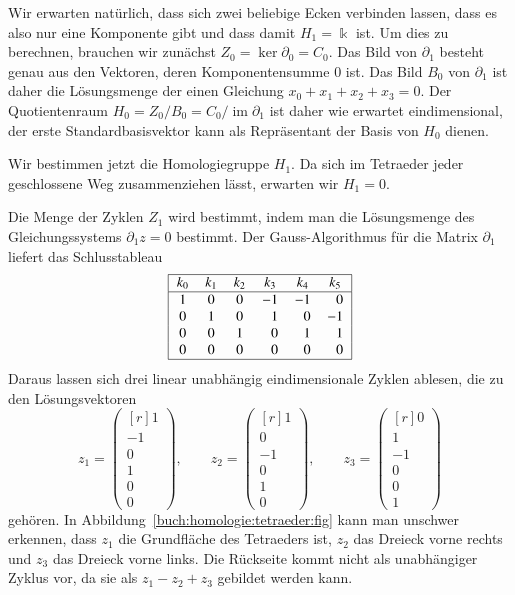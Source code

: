 \begin{beispiel}
Wir erwarten natürlich, dass sich zwei beliebige Ecken verbinden lassen,
dass es also nur eine Komponente gibt und dass damit $H_1=\Bbbk$ ist.
Um dies zu berechnen, brauchen wir zunächst $Z_0=\ker\partial_0=C_0$.
Das Bild von $\partial_1$ besteht genau aus den Vektoren,
deren Komponentensumme $0$ ist.
Das Bild $B_0$ von $\partial_1$ ist daher die Lösungsmenge der einen
Gleichung
\(
x_0+x_1+x_2+x_3=0.
\)
Der Quotientenraum $H_0=Z_0/B_0 = C_0/\operatorname{im}\partial_1$
ist daher wie erwartet eindimensional, der erste Standardbasisvektor
kann als Repräsentant der Basis von $H_0$ dienen.

Wir bestimmen jetzt die Homologiegruppe $H_1$.
Da sich im Tetraeder jeder geschlossene Weg zusammenziehen lässt,
erwarten wir $H_1=0$.

Die Menge der Zyklen $Z_1$ wird bestimmt, indem man die Lösungsmenge
des Gleichungssystems $\partial_1z=0$ bestimmt.
Der Gauss-Algorithmus für die Matrix $\partial_1$ liefert das
Schlusstableau
\[
\begin{tabular}{|>{$}c<{$}>{$}c<{$}>{$}c<{$}>{$}c<{$}>{$}c<{$}>{$}c<{$}|}
\hline
k_0&k_1&k_2&k_3&k_4&k_5\\
\hline
   1&  0&  0& -1& -1& \phantom{-}0\\
   0&  1&  0&  \phantom{-}1&  \phantom{-}0& -1\\
   0&  0&  1&  \phantom{-}0&  \phantom{-}1&  \phantom{-}1\\
   0&  0&  0&  \phantom{-}0&  \phantom{-}0&  \phantom{-}0\\
\hline
\end{tabular}
\]
Daraus lassen sich drei linear unabhängig eindimensionale Zyklen ablesen,
die zu den Lösungsvektoren
\[
z_1
=
\begin{pmatrix*}[r]
1\\
-1\\
0\\
1\\
0\\
0
\end{pmatrix*},
\qquad
z_2
=
\begin{pmatrix*}[r]
1\\
0\\
-1\\
0\\
1\\
0
\end{pmatrix*},
\qquad
z_3
=
\begin{pmatrix*}[r]
0\\
1\\
-1\\
0\\
0\\
1
\end{pmatrix*}
\]
gehören.
In Abbildung~\ref{buch:homologie:tetraeder:fig} kann man unschwer erkennen,
dass $z_1$ die Grundfläche des Tetraeders ist, $z_2$ das Dreieck vorne
rechts und $z_3$ das Dreieck vorne links.
Die Rückseite kommt nicht als unabhängiger Zyklus vor, da sie als $z_1-z_2+z_3$
gebildet werden kann.


\end{beispiel}
